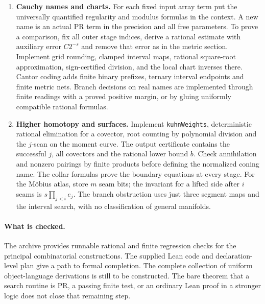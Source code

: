 \begin{enumerate}
\item \textbf{Cauchy names and charts.} For each fixed input array term put the universally quantified regularity and modulus formulas in the context. A new name is an actual PR term in the precision and all free parameters. To prove a comparison, fix all outer stage indices, derive a rational estimate with auxiliary error $C2^{-s}$ and remove that error as in the metric section. Implement grid rounding, clamped interval maps, rational square-root approximation, sign-certified division, and the local chart inverses there. Cantor coding adds finite binary prefixes, ternary interval endpoints and finite metric nets. Branch decisions on real names are implemented through finite readings with a proved positive margin, or by gluing uniformly compatible rational formulas.
\item \textbf{Higher homotopy and surfaces.} Implement \texttt{kuhnWeights}, deterministic rational elimination for a covector, root counting by polynomial division and the $j$-scan on the moment curve. The output certificate contains the successful $j$, all covectors and the rational lower bound $b$. Check annihilation and nonzero pairings by finite products before defining the normalized coning name. The collar formulas prove the boundary equations at every stage. For the Möbius atlas, store $m$ seam bits; the invariant for a lifted side after $i$ seams is $s\prod_{j<i}e_j$. The branch obstruction uses just three segment maps and the interval search, with no classification of general manifolds.
\end{enumerate}
\paragraph{What is checked.}
The archive provides runnable rational and finite regression checks for the principal combinatorial constructions. The supplied Lean code and declaration-level plan give a path to formal completion. The complete collection of uniform object-language derivations is still to be constructed. The bare theorem that a search routine is PR, a passing finite test, or an ordinary Lean proof in a stronger logic does not close that remaining step.
